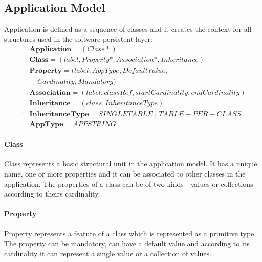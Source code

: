 \documentclass[runningheads]{comsis}
\begin{document}


\subsection{Application Model}
Application is defined as a sequence of classes and it creates the context for all structures used in the software persistent layer:
\begin{align}
& \mathbf{Application} = (Class*) \\
& 	\mathbf{Class} = (label, Property*, Association*, Inheritance) \\
& \mathbf{Property} = (label, AppType, DefaultValue, \nonumber \\ & \;\;\;\;  Cardinality, Mandatory) \\
&	\mathbf{Association} = (label, classRef, startCardinality, endCardinality)  \\
& \mathbf{Inheritance} = (class, InheritanceType) \\¨
& \mathbf{InheritanceType} = SINGLETABLE \; | \; TABLE-PER-CLASS \\
& \mathbf{AppType} = APPSTRING
\end{align}

\paragraph{Class} Class represents a basic structural unit in the application model. It has a unique name, one or more properties and it can be associated to other classes in the application. The properties of a class can be of two kinds - values or collections - according to theirs cardinality.
	 
\paragraph{Property} Property represents a feature of a class which is represented as a primitive type. The property can be mandatory, can have a default value and according to its cardinality it can represent a single value or a collection of values. 
\end{document}
